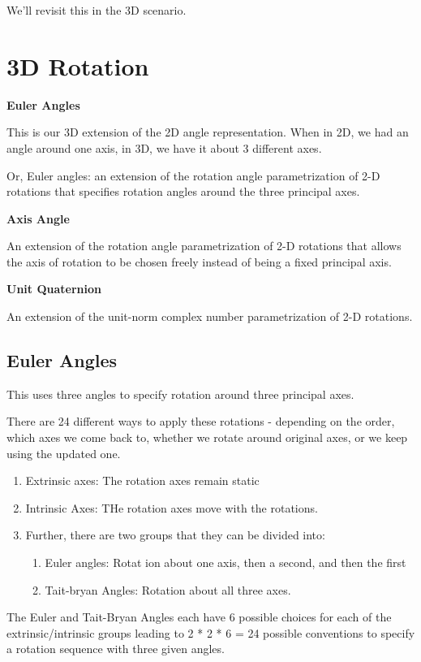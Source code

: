 We'll revisit this in the 3D scenario.

\section{3D Rotation}

\textbf{Euler Angles}

This is our 3D extension of the 2D angle representation. When in 2D, we had an angle around one axis, in 3D, we have it about 3 different axes.

Or, Euler angles: an extension of the rotation angle parametrization of 2-D rotations that specifies rotation angles around the three principal axes.

\textbf{Axis Angle}

An extension of the rotation angle parametrization of 2-D rotations that allows the axis of rotation to be chosen freely instead of being a fixed principal axis.

\textbf{Unit Quaternion}

An extension of the unit-norm complex number parametrization of 2-D rotations.

\subsection{Euler Angles}

This uses three angles to specify rotation around three principal axes.

There are 24 different ways to apply these rotations - depending on the order, which axes we come back to, whether we rotate around original axes, or we keep using the updated one.

\begin{enumerate}
    \item Extrinsic axes: The rotation axes remain static
    \item Intrinsic Axes: THe rotation axes move with the rotations.
    \item Further, there are two groups that they can be divided into:
    \begin{enumerate}
        \item Euler angles: Rotat ion about one axis, then a second, and then the first
        \item Tait-bryan Angles: Rotation about all three axes.
    \end{enumerate}
\end{enumerate}

The Euler and Tait-Bryan Angles each have 6 possible choices for each of the extrinsic/intrinsic groups leading to 2 * 2 * 6 = 24 possible conventions to specify a rotation sequence with three given angles.

